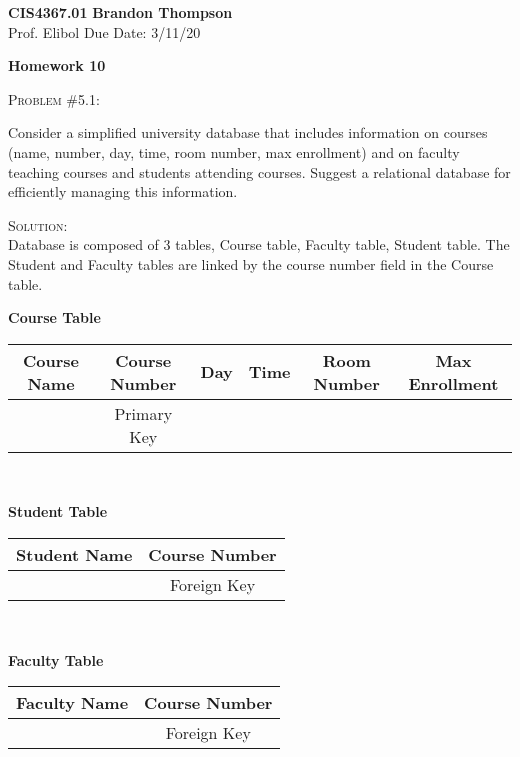 \documentclass[12pt]{article}
\newenvironment{problem}[1]
{\begin{mdframed}[linewidth=0.8pt]
        \textsc{Problem #1:}

}
    {\end{mdframed}}
\newenvironment{solution}
    {\textsc{Solution:}\\}
    {\newpage}%
\begin{document}
\noindent
\textbf{CIS4367.01} \hfill \textbf{Brandon Thompson} \\
\normalsize Prof. Elibol \hfill Due Date: 3/11/20 \\

\begin{center}
\textbf{Homework 10}
\end{center}
	\begin{problem}{\#5.1}
		Consider a simplified university database that includes information
		on courses (name, number, day, time, room number, max enrollment)
		and on faculty teaching courses and students attending courses.
		Suggest a relational database for efficiently managing this information.
	\end{problem}
	\begin{solution}
		Database is composed of 3 tables, Course table, Faculty table, Student table.
		The Student and Faculty tables are linked by the course number field in the Course table.
		\begin{center}
			\textbf{Course Table}\\
			\vspace{1em}
			\begin{tabular}{|c|c|c|c|c|c|}
				\hline
				\textbf{Course Name} & \textbf{Course Number} & \textbf{Day} & \textbf{Time} & \textbf{Room Number} & \textbf{Max Enrollment}\\
				\hline
				& Primary Key& & & &\\
				\hline
			\end{tabular}
		\end{center}
		\\
		\vspace{2.5em}
		\begin{center}
			\textbf{Student Table}\\
			\vspace{1em}
			\begin{tabular}{|c|c|}
				\hline
				\textbf{Student Name} & \textbf{Course Number}\\
				\hline
				& Foreign Key\\
				\hline
			\end{tabular}
		\end{center}
		\\
		\vspace{2.5em}
		\begin{center}
			\textbf{Faculty Table}\\
			\vspace{1em}
			\begin{tabular}{|c|c|}
				\hline
				\textbf{Faculty Name} & \textbf{Course Number}\\
				\hline 
				& Foreign Key\\
				\hline
			\end{tabular}
		\end{center}
	\end{solution}
\end{document}
